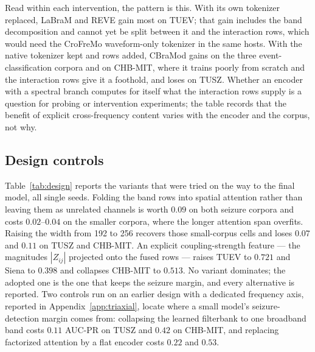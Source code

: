 Read within each intervention, the pattern is this. With its own
tokenizer replaced, LaBraM and REVE gain most on TUEV; that gain includes
the band decomposition and cannot yet be split between it and the
interaction rows, which would need the CroFreMo waveform-only tokenizer
in the same hosts. With the native tokenizer kept and rows added, CBraMod
gains on the three event-classification corpora and on CHB-MIT, where it
trains poorly from scratch and the interaction rows give it a foothold,
and loses on TUSZ. Whether an encoder with a spectral branch computes for
itself what the interaction rows supply is a question for probing or
intervention experiments; the table records that the benefit of explicit
cross-frequency content varies with the encoder and the corpus, not why.

\subsection{Design controls}
\label{sec:design}

Table~\ref{tab:design} reports the variants that were tried on the way
to the final model, all single seeds. Folding the band rows
into spatial attention rather than leaving them as unrelated channels is
worth $0.09$ on both seizure corpora and costs $0.02$--$0.04$ on the
smaller corpora, where the longer attention span overfits. Raising the
width from 192 to 256 recovers those small-corpus cells and loses
$0.07$ and $0.11$ on TUSZ and CHB-MIT. An explicit coupling-strength
feature --- the magnitudes $|Z_{ij}|$ projected onto the fused rows ---
raises TUEV to $0.721$ and Siena to $0.398$ and collapses CHB-MIT to
$0.513$. No variant dominates; the adopted one is the one that keeps the
seizure margin, and every alternative is reported. Two controls run on an earlier design with a dedicated frequency axis,
reported in Appendix~\ref{app:triaxial}, locate where a small model's
seizure-detection margin comes from: collapsing the learned filterbank to
one broadband band costs $0.11$ AUC-PR on TUSZ and $0.42$ on CHB-MIT, and
replacing factorized attention by a flat encoder costs $0.22$ and $0.53$.

